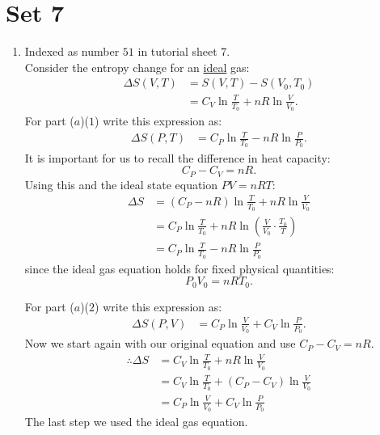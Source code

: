 \pagestyle{fancy}
\fancyhead{}

\section{Set 7}
\begin{enumerate}
    \item Indexed as number $51$ in tutorial sheet 7. \\
    
    Consider the entropy change for an \underline{ideal} gas:
    \begin{align*}
        \Delta S(V,T)
        &=S(V,T)-S(V_0,T_0) \\
        &=C_V\ln\frac{T}{T_0}+nR\ln\frac{V}{V_0}.
    \end{align*}
    For part ($a$)($1$) write this expression as:
    \begin{align*}
        \Delta S(P,T)
        &=C_P\ln\frac{T}{T_0}-nR\ln\frac{P}{P_0}.
    \end{align*}
    It is important for us to recall the difference in heat capacity:
    $$C_P-C_V=nR.$$
    Using this and the ideal state equation $PV=nRT$:
    \begin{align*}
        \Delta S
        &=(C_P-nR)\ln\frac{T}{T_0}+nR\ln\frac{V}{V_0} \\
        &=C_P\ln\frac{T}{T_0}+nR\ln\left(
            \frac{V}{V_0}\cdot\frac{T_0}{T}
        \right) \\
        &=C_P\ln\frac{T}{T_0}-nR\ln\frac{P}{P_0}
    \end{align*}
    since the ideal gas equation holds for fixed physical quantities:
    $$P_0 V_0=nRT_0.$$

    For part ($a$)($2$) write this expression as:
    \begin{align*}
        \Delta S(P,V)
        &=C_P\ln\frac{V}{V_0}+C_V\ln\frac{P}{P_0}.
    \end{align*}
    Now we start again with our original equation and
    use $C_P-C_V=nR$.
    \begin{align*}
        \therefore\Delta S
        &=C_V\ln\frac{T}{T_0}+nR\ln\frac{V}{V_0} \\
        &=C_V\ln\frac{T}{T_0}+(C_P-C_V)\ln\frac{V}{V_0} \\
        &=C_P\ln\frac{V}{V_0}+C_V\ln\frac{P}{P_0}
    \end{align*}
    The last step we used the ideal gas equation.


\end{enumerate}
